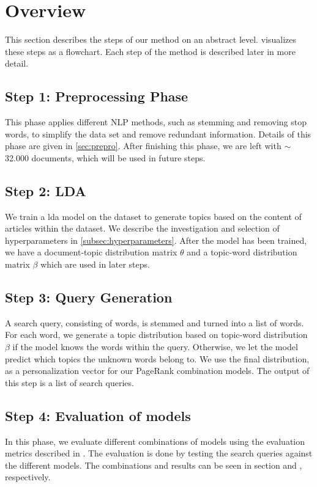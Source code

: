 \section{Overview}\label{sec:method}
This section describes the steps of our method on an abstract level.
 visualizes these steps as a flowchart.
Each step of the method is described later in more detail. 


\subsection*{Step 1: Preprocessing Phase}
This phase applies different \gls{NLP} methods, such as stemming and removing stop words, to simplify the data set and remove redundant information.
Details of this phase are given in \autoref{sec:prepro}.
After finishing this phase, we are left with $\sim$32.000 documents, which will be used in future steps.

\subsection*{Step 2: LDA}
We train a \acrfull{lda} model on the dataset to generate topics based on the content of articles within the dataset. 
We describe the investigation and selection of hyperparameters in \autoref{subsec:hyperparameters}. 
After the model has been trained, we have a document-topic distribution matrix $\theta$ and a topic-word distribution matrix $\beta$ which are used in later steps.

\subsection*{Step 3: Query Generation}
A search query, consisting of words, is stemmed and turned into a list of words.
For each word, we generate a topic distribution based on topic-word distribution $\beta$ if the model knows the words within the query.
Otherwise, we let the model predict which topics the unknown words belong to.
We use the final distribution, as a personalization vector for our PageRank combination models.
The output of this step is a list of search queries.


\subsection*{Step 4: Evaluation of models}
In this phase, we evaluate different combinations of models using the evaluation metrics described in .
The evaluation is done by testing the search queries against the different models. 
The combinations and results can be seen in section  and , respectively.



